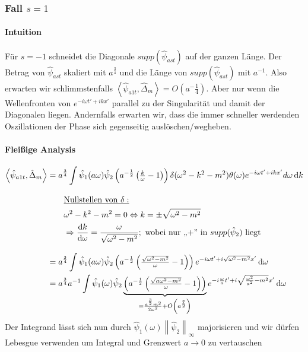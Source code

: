 \subsubsection*{Fall $s=1$}
\paragraph*{Intuition}
Für $s=-1$ schneidet die Diagonale  $supp (\hat \psi_{ast})$ auf der ganzen Länge. Der Betrag von $\hat\psi_{ast}$ skaliert mit $a^{\frac{3}{4}}$ und die Länge von $supp (\hat \psi_{ast})$ mit $a^{-1}$. Also erwarten wir schlimmstenfalls $\left< \hat \psi_{a1t}, \hat\Delta_m\right> = O(a^-{\frac{1}{4}})$. Aber nur wenn die Wellenfronten von $e^{-i\omega t'+i k x'}$ parallel zu der Singularität und damit der Diagonalen liegen. Andernfalls erwarten wir, dass die immer schneller werdenden Oszillationen der Phase sich gegenseitig auslöschen/wegheben.

\paragraph*{Fleißige Analysis}
\begin{align}
    \left<\hat \psi_{a1t} ,\hat \Delta_m\right> &=
        a^\frac{3}{4} \int \hat \psi_1(a\omega)
        \hat\psi_2\left(a^{-\frac{1}{2}} \left(\tfrac{k}{\omega}-1\right)\right)
        \delta (\omega^2 - k^2 - m^2) \theta(\omega)
        e^{-i\omega t' + ikx'} d \omega \mathop{}\!\mathrm{d} k \nonumber \\[2ex]
        & \kern 2em \underline{\textrm{Nullstellen von $\delta$}:}
        \nonumber \\
        & \kern 2em \omega^2 - k^2 - m^2 = 0 \Leftrightarrow k = \pm \sqrt{\omega^2-m^2}
        \nonumber \\
        & \kern 2em \Rightarrow \frac{\mathop{}\!\mathrm{d} k}{\mathop{}\!\mathrm{d} \omega} = \frac{\omega}{\sqrt{\omega^2-m^2}}; \textrm{   wobei nur ,,+'' in $supp (\hat \psi_2)$ liegt}
        \nonumber \\[2ex]
        &= a^\frac{3}{4} \int \hat\psi_1(a \omega)
        \hat\psi_2\left(a^{-\frac{1}{2}} \left(\tfrac{\sqrt{\omega^2-m^2}}{\omega}-1\right)\right)
        e^{-i\omega t' + i \sqrt{\omega^2-m^2}x'}
        \mathop{}\!\mathrm{d} \omega \nonumber \\
        &= a^\frac{3}{4} a^{-1} \int \hat\psi_1(\omega)
        \hat\psi_2
        \underbrace{
        \left(
            a^{-\frac{1}{2}} \left(\tfrac{\sqrt{a\omega^2-m^2}}{\omega}-1\right)
        \right)}_{= \frac{a^\frac{3}{2}m^2}{2 \omega^2} + O\left(a^\frac{7}{2}\right)}
        e^{-i\frac{\omega}{a} t' + i \sqrt{\frac{\omega^2}{a^2}-m^2}x'}
        \mathop{}\!\mathrm{d} \omega \nonumber
\end{align}
Der Integrand lässt sich nun durch $\hat \psi_1(\omega) \left\lVert \hat\psi_2\right\lVert_\infty$ majorisieren und wir dürfen Lebesgue verwenden um Integral und Grenzwert $a \rightarrow 0$ zu vertauschen

